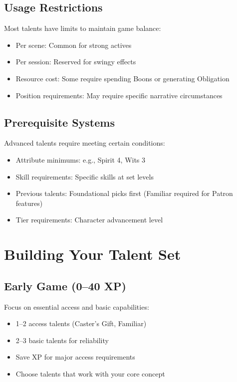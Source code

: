 \documentclass[11pt,twoside,openany]{book}
\begin{document}
\subsection*{Usage Restrictions}

Most talents have limits to maintain game balance:
\begin{itemize}
\item Per scene: Common for strong actives
\item Per session: Reserved for swingy effects
\item Resource cost: Some require spending Boons or generating Obligation
\item Position requirements: May require specific narrative circumstances
\end{itemize}

\subsection*{Prerequisite Systems}

Advanced talents require meeting certain conditions:
\begin{itemize}
\item Attribute minimums: e.g., Spirit 4, Wits 3
\item Skill requirements: Specific skills at set levels
\item Previous talents: Foundational picks first (Familiar required for Patron features)
\item Tier requirements: Character advancement level
\end{itemize}

\section*{Building Your Talent Set} 

\subsection*{Early Game (0–40 XP)}

Focus on essential access and basic capabilities:
\begin{itemize}
\item 1–2 access talents (Caster's Gift, Familiar)
\item 2–3 basic talents for reliability
\item Save XP for major access requirements
\item Choose talents that work with your core concept
\end{itemize}
\end{document}
